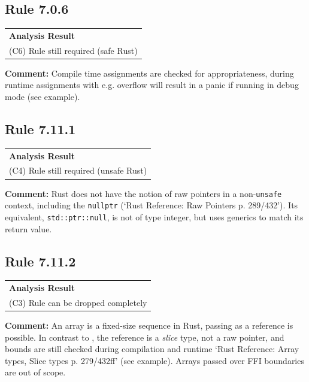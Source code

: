 \subsection*{Rule 7.0.6}
\begin{longtable}{p{13cm}}
\textbf{Analysis Result} \\
(C6) Rule still required (safe Rust) \\
\end{longtable}
\textbf{Comment:} Compile time assignments are checked for appropriateness, during runtime assignments with e.g. overflow will result in a panic if running in debug mode (see example). \\


\subsection*{Rule 7.11.1}
\begin{longtable}{p{13cm}}
\textbf{Analysis Result} \\
(C4) Rule still required (unsafe Rust) \\
\end{longtable}
\textbf{Comment:} Rust does not have the notion of raw pointers in a non-\texttt{unsafe} context, including the \texttt{nullptr} (`Rust Reference: Raw Pointers p. 289/432'). Its equivalent, \texttt{std::ptr::null}, is not of type integer, but uses generics to match its return value. \\
\subsection*{Rule 7.11.2}
\begin{longtable}{p{13cm}}
\textbf{Analysis Result} \\
(C3) Rule can be dropped completely \\
\end{longtable}
\textbf{Comment:} An array is a fixed-size sequence in Rust, passing as a reference is possible. In contrast to \Cpp, the reference is a \textit{slice} type, not a raw pointer, and bounds are still checked during compilation and runtime `Rust Reference: Array types, Slice types p. 279/432ff' (see example). Arrays passed over FFI boundaries are out of scope. \\



